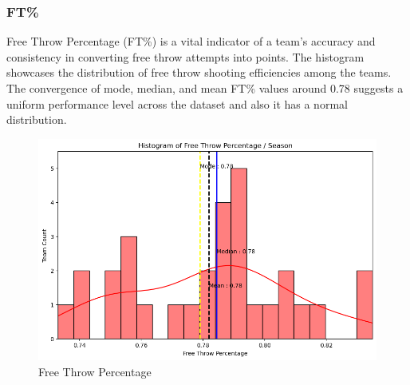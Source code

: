 \documentclass[conference]{IEEEtran}
\begin{document}
\subsubsection{FT\%}
Free Throw Percentage (FT\%) is a vital indicator of a team's accuracy and consistency in converting free throw attempts into points. The histogram showcases the distribution of free throw shooting efficiencies among the teams. The convergence of mode, median, and mean FT\% values around 0.78 suggests a uniform performance level across the dataset and also it has a normal distribution.
\begin{figure}[h]
    \centering
    \includegraphics[scale=0.41]{FT_image.png}
    \caption{Free Throw Percentage}
    \label{fig:enter-label}
\end{figure}
\end{document}
